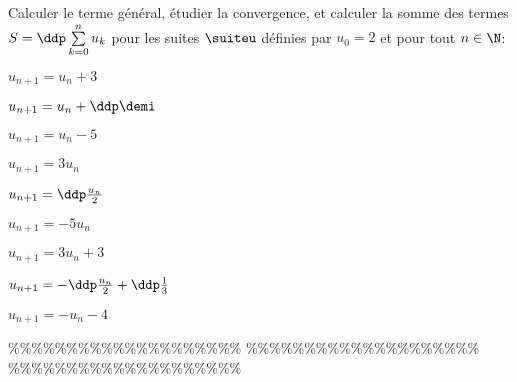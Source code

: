 



\begin{exercice} \;
Calculer le terme g\'en\'eral, \'etudier la convergence, et calculer la somme des termes $S=\ddp \sum\limits_{k=0}^n u_k$ pour les suites $\suiteu$ d\'efinies par $u_0=2$ et pour tout $n\in\N$:\\
\begin{enumerate}
\begin{minipage}[t]{0.3\textwidth}
\item 
$u_{n+1}=u_n+3$
\item $u_{n+1}=u_n+\ddp\demi$  
\item  
$u_{n+1}=u_n-5$
\end{minipage}
\begin{minipage}[t]{0.3\textwidth}
\item
$u_{n+1}=3u_n$ 
\item
$u_{n+1}=\ddp\frac{u_n}{2}$   
\item  
$u_{n+1}=-5u_n$ 
\end{minipage}
\begin{minipage}[t]{0.3\textwidth}
\item
$u_{n+1}=3u_n+3$  
\item
$u_{n+1}=-\ddp\frac{u_n}{2}+\ddp\frac{1}{3}$   
\item  
$u_{n+1}=-u_n  -4$ 
\end{minipage}
\end{enumerate}
\end{exercice}


\%\%\%\%\%\%\%\%\%\%\%\%\%\%\%\%\%\%\%\%
\%\%\%\%\%\%\%\%\%\%\%\%\%\%\%\%\%\%\%\%
\%\%\%\%\%\%\%\%\%\%\%\%\%\%\%\%\%\%\%\%




